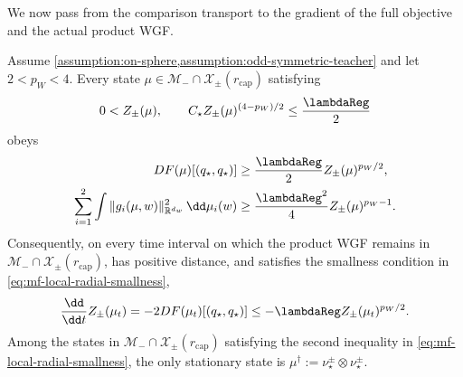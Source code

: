 We now pass from the comparison transport to the gradient of the full
objective and the actual product WGF.

\begin{proposition}
\label{lem:radial-positivity-antisymmetric-branch-full-density}
Assume \cref{assumption:on-sphere,assumption:odd-symmetric-teacher} and let
\(2<p_W<4\). Every state
\(\mu\in\mathcal M_-\cap\mathcal X_\pm(r_{\mathrm{cap}})\) satisfying
\begin{equation}
\label{eq:mf-local-radial-smallness}
 0<Z_\pm(\mu),\qquad
 C_\star Z_\pm(\mu)^{(4-p_W)/2}\le\frac{\lambdaReg}{2}
\end{equation}
obeys
\begin{equation}
\label{eq:mf-local-radial-dissipation}
\begin{aligned}
 DF(\mu)[(q_\star,q_\star)]
 &\ge\frac{\lambdaReg}{2}Z_\pm(\mu)^{p_W/2},\\
 \sum_{i=1}^2\int
 \|g_i(\mu,w)\|_{\mathbb R^{d_w}}^2\,\dd\mu_i(w)
 &\ge\frac{\lambdaReg^2}{4}Z_\pm(\mu)^{p_W-1}.
\end{aligned}
\end{equation}
Consequently, on every time interval on which the product WGF remains in
\(\mathcal M_-\cap\mathcal X_\pm(r_{\mathrm{cap}})\), has positive distance,
and satisfies the smallness condition in
\cref{eq:mf-local-radial-smallness},
\begin{equation}
\label{eq:mf-local-distance-differential}
 \frac{\dd}{\dd t}Z_\pm(\mu_t)
 =-2DF(\mu_t)[(q_\star,q_\star)]
 \le-\lambdaReg Z_\pm(\mu_t)^{p_W/2}.
\end{equation}
Among the states in
\(\mathcal M_-\cap\mathcal X_\pm(r_{\mathrm{cap}})\) satisfying the second
inequality in \cref{eq:mf-local-radial-smallness}, the only stationary state
is \(\mu^\dagger:=\nu_\star^\pm\otimes\nu_\star^\pm\).
\end{proposition}

